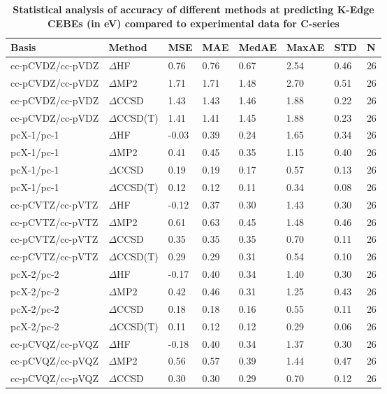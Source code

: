 \begin{table}
  \caption{\textbf{Statistical analysis of accuracy of different methods at predicting K-Edge CEBEs (in eV) compared to experimental data for C-series}}
  \begin{tabular}{l l l l l l l l }
    \toprule
    \textbf{Basis} & \textbf{Method} & \textbf{MSE} & \textbf{MAE} & \textbf{MedAE} & \textbf{MaxAE} & \textbf{STD} & \textbf{N} \\ 
    \midrule
    cc-pCVDZ/cc-pVDZ & $\Delta$HF & 0.76 & 0.76 & 0.67 & 2.54 & 0.46 & 26 \\ 
    cc-pCVDZ/cc-pVDZ & $\Delta$MP2 & 1.71 & 1.71 & 1.48 & 2.70 & 0.51 & 26 \\ 
    cc-pCVDZ/cc-pVDZ & $\Delta$CCSD & 1.43 & 1.43 & 1.46 & 1.88 & 0.22 & 26 \\ 
    cc-pCVDZ/cc-pVDZ & $\Delta$CCSD(T) & 1.41 & 1.41 & 1.45 & 1.88 & 0.23 & 26 \\ 
    pcX-1/pc-1 & $\Delta$HF & -0.03 & 0.39 & 0.24 & 1.65 & 0.34 & 26 \\ 
    pcX-1/pc-1 & $\Delta$MP2 & 0.41 & 0.45 & 0.35 & 1.15 & 0.40 & 26 \\ 
    pcX-1/pc-1 & $\Delta$CCSD & 0.19 & 0.19 & 0.17 & 0.57 & 0.13 & 26 \\ 
    pcX-1/pc-1 & $\Delta$CCSD(T) & 0.12 & 0.12 & 0.11 & 0.34 & 0.08 & 26 \\ 
    cc-pCVTZ/cc-pVTZ & $\Delta$HF & -0.12 & 0.37 & 0.30 & 1.43 & 0.30 & 26 \\ 
    cc-pCVTZ/cc-pVTZ & $\Delta$MP2 & 0.61 & 0.63 & 0.45 & 1.48 & 0.46 & 26 \\ 
    cc-pCVTZ/cc-pVTZ & $\Delta$CCSD & 0.35 & 0.35 & 0.35 & 0.70 & 0.11 & 26 \\ 
    cc-pCVTZ/cc-pVTZ & $\Delta$CCSD(T) & 0.29 & 0.29 & 0.31 & 0.54 & 0.10 & 26 \\ 
    pcX-2/pc-2 & $\Delta$HF & -0.17 & 0.40 & 0.34 & 1.40 & 0.30 & 26 \\ 
    pcX-2/pc-2 & $\Delta$MP2 & 0.42 & 0.46 & 0.31 & 1.25 & 0.43 & 26 \\ 
    pcX-2/pc-2 & $\Delta$CCSD & 0.18 & 0.18 & 0.16 & 0.55 & 0.11 & 26 \\ 
    pcX-2/pc-2 & $\Delta$CCSD(T) & 0.11 & 0.12 & 0.12 & 0.29 & 0.06 & 26 \\ 
    cc-pCVQZ/cc-pVQZ & $\Delta$HF & -0.18 & 0.40 & 0.34 & 1.37 & 0.30 & 26 \\ 
    cc-pCVQZ/cc-pVQZ & $\Delta$MP2 & 0.56 & 0.57 & 0.39 & 1.44 & 0.47 & 26 \\ 
    cc-pCVQZ/cc-pVQZ & $\Delta$CCSD & 0.30 & 0.30 & 0.29 & 0.70 & 0.12 & 26 \\ 

\end{tabular}
\end{table}
